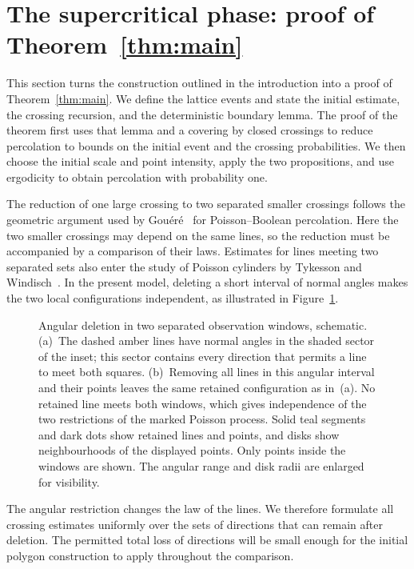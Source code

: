 \documentclass[11pt,letterpaper]{article}
\begin{document}
\section{The supercritical phase: proof of \texorpdfstring{Theorem~\ref{thm:main}}{the first main theorem}}
\label{sec:strategy}

This section turns the construction outlined in the introduction into a proof of Theorem~\ref{thm:main}. We define the lattice events and state the initial estimate, the crossing recursion, and the deterministic boundary lemma. The proof of the theorem first uses that lemma and a covering by closed crossings to reduce percolation to bounds on the initial event and the crossing probabilities. We then choose the initial scale and point intensity, apply the two propositions, and use ergodicity to obtain percolation with probability one.

The reduction of one large crossing to two separated smaller crossings follows the geometric argument used by Gou\'er\'e~\cite[Lemma~3.3]{Gou08} for Poisson--Boolean percolation. Here the two smaller crossings may depend on the same lines, so the reduction must be accompanied by a comparison of their laws. Estimates for lines meeting two separated sets also enter the study of Poisson cylinders by Tykesson and Windisch~\cite[Lemma~3.1]{TW12}. In the present model, deleting a short interval of normal angles makes the two local configurations independent, as illustrated in Figure~\ref{fig:deletion}.

\begin{figure}[ht]
  \centering
  
  \caption{Angular deletion in two separated observation windows, schematic. (a)~The dashed amber lines have normal angles in the shaded sector of the inset; this sector contains every direction that permits a line to meet both squares. (b)~Removing all lines in this angular interval and their points leaves the same retained configuration as in~(a). No retained line meets both windows, which gives independence of the two restrictions of the marked Poisson process. Solid teal segments and dark dots show retained lines and points, and disks show neighbourhoods of the displayed points. Only points inside the windows are shown. The angular range and disk radii are enlarged for visibility.}
  \label{fig:deletion}
\end{figure}

The angular restriction changes the law of the lines. We therefore formulate all crossing estimates uniformly over the sets of directions that can remain after deletion. The permitted total loss of directions will be small enough for the initial polygon construction to apply throughout the comparison.
\end{document}
